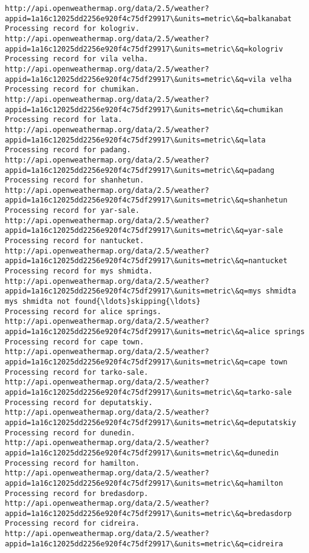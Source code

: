 \documentclass[11pt]{article}
\begin{document}
\begin{Verbatim}[commandchars=\\\{\}]
http://api.openweathermap.org/data/2.5/weather?appid=1a16c12025dd2256e920f4c75df29917\&units=metric\&q=balkanabat
Processing record for kologriv.
http://api.openweathermap.org/data/2.5/weather?appid=1a16c12025dd2256e920f4c75df29917\&units=metric\&q=kologriv
Processing record for vila velha.
http://api.openweathermap.org/data/2.5/weather?appid=1a16c12025dd2256e920f4c75df29917\&units=metric\&q=vila velha
Processing record for chumikan.
http://api.openweathermap.org/data/2.5/weather?appid=1a16c12025dd2256e920f4c75df29917\&units=metric\&q=chumikan
Processing record for lata.
http://api.openweathermap.org/data/2.5/weather?appid=1a16c12025dd2256e920f4c75df29917\&units=metric\&q=lata
Processing record for padang.
http://api.openweathermap.org/data/2.5/weather?appid=1a16c12025dd2256e920f4c75df29917\&units=metric\&q=padang
Processing record for shanhetun.
http://api.openweathermap.org/data/2.5/weather?appid=1a16c12025dd2256e920f4c75df29917\&units=metric\&q=shanhetun
Processing record for yar-sale.
http://api.openweathermap.org/data/2.5/weather?appid=1a16c12025dd2256e920f4c75df29917\&units=metric\&q=yar-sale
Processing record for nantucket.
http://api.openweathermap.org/data/2.5/weather?appid=1a16c12025dd2256e920f4c75df29917\&units=metric\&q=nantucket
Processing record for mys shmidta.
http://api.openweathermap.org/data/2.5/weather?appid=1a16c12025dd2256e920f4c75df29917\&units=metric\&q=mys shmidta
mys shmidta not found{\ldots}skipping{\ldots}
Processing record for alice springs.
http://api.openweathermap.org/data/2.5/weather?appid=1a16c12025dd2256e920f4c75df29917\&units=metric\&q=alice springs
Processing record for cape town.
http://api.openweathermap.org/data/2.5/weather?appid=1a16c12025dd2256e920f4c75df29917\&units=metric\&q=cape town
Processing record for tarko-sale.
http://api.openweathermap.org/data/2.5/weather?appid=1a16c12025dd2256e920f4c75df29917\&units=metric\&q=tarko-sale
Processing record for deputatskiy.
http://api.openweathermap.org/data/2.5/weather?appid=1a16c12025dd2256e920f4c75df29917\&units=metric\&q=deputatskiy
Processing record for dunedin.
http://api.openweathermap.org/data/2.5/weather?appid=1a16c12025dd2256e920f4c75df29917\&units=metric\&q=dunedin
Processing record for hamilton.
http://api.openweathermap.org/data/2.5/weather?appid=1a16c12025dd2256e920f4c75df29917\&units=metric\&q=hamilton
Processing record for bredasdorp.
http://api.openweathermap.org/data/2.5/weather?appid=1a16c12025dd2256e920f4c75df29917\&units=metric\&q=bredasdorp
Processing record for cidreira.
http://api.openweathermap.org/data/2.5/weather?appid=1a16c12025dd2256e920f4c75df29917\&units=metric\&q=cidreira

\end{Verbatim}
\end{document}

